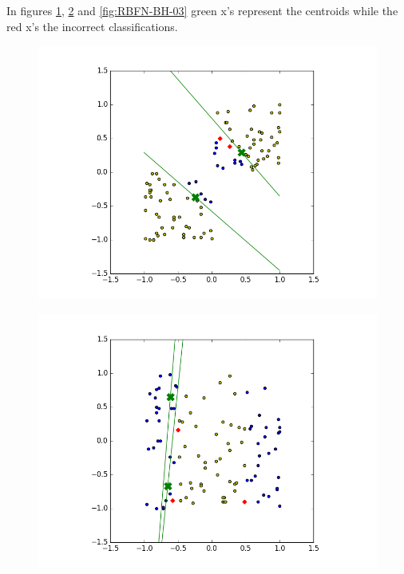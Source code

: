 \documentclass[notitlepage]{report}
\theoremstyle{definition}
\begin{document}
In figures \ref{fig:RBFN-BH-01}, \ref{fig:RBFN-BH-02} and \ref{fig:RBFN-BH-03} green x's represent the centroids while the red x's the incorrect classifications.


\begin{figure}[H]
  \centering
  \begin{minipage}[b]{0.7\textwidth}
    \includegraphics[width=\textwidth]{RBFN-BH-01.png}
    \caption{}
    \label{fig:RBFN-BH-01}
  \end{minipage}
  \hfill
\end{figure}
\begin{figure}[H]
  \centering
  \begin{minipage}[b]{0.7\textwidth}
    \includegraphics[width=\textwidth]{RBFN-BH-02.png}
    \caption{}
    \label{fig:RBFN-BH-02}
  \end{minipage}
  \hfill
\end{figure}
\end{document}
